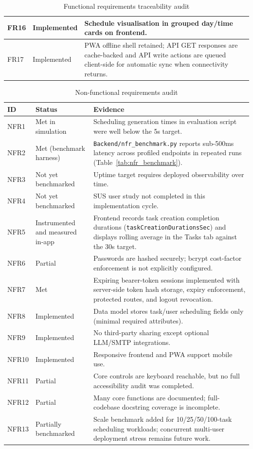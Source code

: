 \documentclass[12pt]{article}
\begin{document}
\begin{table}[h!]
\begin{tabular}{|l|p{2.3cm}|p{8.0cm}|}
\hline
FR16 & Implemented & Schedule visualisation in grouped day/time cards on frontend. \\
\hline
FR17 & Implemented & PWA offline shell retained; API GET responses are cache-backed and API write actions are queued client-side for automatic sync when connectivity returns. \\
\hline
\end{tabular}
\caption{Functional requirements traceability audit}
\label{tab:fr_traceability}
\end{table}

\begin{table}[h!]
\centering
\scriptsize
\begin{tabular}{|l|p{2.3cm}|p{8.0cm}|}
\hline
\textbf{ID} & \textbf{Status} & \textbf{Evidence} \\
\hline
NFR1 & Met in simulation & Scheduling generation times in evaluation script were well below the 5s target. \\
\hline
NFR2 & Met (benchmark harness) & \texttt{Backend/nfr\_benchmark.py} reports sub-500ms latency across profiled endpoints in repeated runs (Table~\ref{tab:nfr_benchmark}). \\
\hline
NFR3 & Not yet benchmarked & Uptime target requires deployed observability over time. \\
\hline
NFR4 & Not yet benchmarked & SUS user study not completed in this implementation cycle. \\
\hline
NFR5 & Instrumented and measured in-app & Frontend records task creation completion durations (\texttt{taskCreationDurationsSec}) and displays rolling average in the Tasks tab against the 30s target. \\
\hline
NFR6 & Partial & Passwords are hashed securely; bcrypt cost-factor enforcement is not explicitly configured. \\
\hline
NFR7 & Met & Expiring bearer-token sessions implemented with server-side token hash storage, expiry enforcement, protected routes, and logout revocation. \\
\hline
NFR8 & Implemented & Data model stores task/user scheduling fields only (minimal required attributes). \\
\hline
NFR9 & Implemented & No third-party sharing except optional LLM/SMTP integrations. \\
\hline
NFR10 & Implemented & Responsive frontend and PWA support mobile use. \\
\hline
NFR11 & Partial & Core controls are keyboard reachable, but no full accessibility audit was completed. \\
\hline
NFR12 & Partial & Many core functions are documented; full-codebase docstring coverage is incomplete. \\
\hline
NFR13 & Partially benchmarked & Scale benchmark added for 10/25/50/100-task scheduling workloads; concurrent multi-user deployment stress remains future work. \\
\hline
\end{tabular}
\caption{Non-functional requirements audit}
\label{tab:nfr_traceability}
\end{table}
\end{document}
